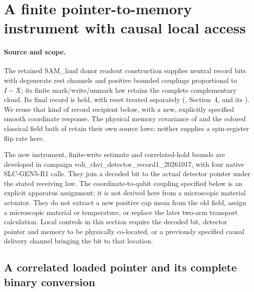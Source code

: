 
\section{A finite pointer-to-memory instrument with causal local access}
\label{sec:chvi-memory-channel}

\paragraph{Source and scope.}
The retained SAM\_land donor readout construction supplies neutral record
bits with degenerate rest channels and positive bounded couplings proportional
to $I-X$; its finite mark/write/unmark law retains the complete complementary
cloud. Its final record is held, with reset treated separately
(, Section~4, and its
). We reuse that kind of record recipient below,
with a new, explicitly specified smooth coordinate response. The physical
memory covariance of  and the colored
classical field bath of  retain their own
source laws; neither supplies a spin-register flip rate here.

The new instrument, finite-write estimate and correlated-hold bounds are
developed in campaign voli\_chvi\_detector\_record1\_20261017, with four
native SLC-GEN5-R1 calls. They join a
decoded bit to the actual detector pointer under the stated receiving law.
The coordinate-to-qubit coupling specified below is an explicit apparatus
assignment; it is not derived here from a microscopic material actuator.
They do not extract a new positive cap mean from the old field, assign a
microscopic material or temperature, or replace the later two-arm transport
calculation. Local controls in this section require the decoded bit, detector
pointer and memory to be physically co-located, or a previously specified
causal delivery channel bringing the bit to that location.

\subsection{A correlated loaded pointer and its complete binary conversion}

